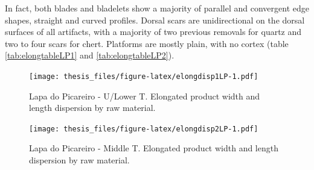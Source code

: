\documentclass[12pt,twoside]{reedthesis}
\begin{document}
In fact, both blades and bladelets show a majority of parallel and convergent edge shapes, straight and curved profiles. Dorsal scars are unidirectional on the dorsal surfaces of all artifacts, with a majority of two previous removals for quartz and two to four scars for chert. Platforms are mostly plain, with no cortex (table \ref{tab:elongtableLP1} and \ref{tab:elongtableLP2}).
\begin{figure}
\centering
\texttt{[image: thesis\_files/figure-latex/elongdisp1LP-1.pdf]}
\caption{\label{fig:elongdisp1LP}Lapa do Picareiro - U/Lower T. Elongated product width and length dispersion by raw material.}
\end{figure}
\begin{figure}
\centering
\texttt{[image: thesis\_files/figure-latex/elongdisp2LP-1.pdf]}
\caption{\label{fig:elongdisp2LP}Lapa do Picareiro - Middle T. Elongated product width and length dispersion by raw material.}
\end{figure}
\end{document}
